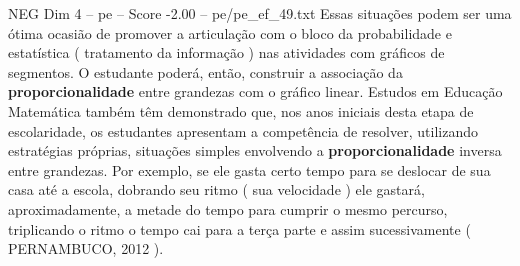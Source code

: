 \begin{textsample}{NEG Dim 4 – pe – Score -2.00 – pe/pe\_ef\_49.txt}
Essas situações podem ser uma ótima ocasião de promover a articulação com o bloco da probabilidade e estatística ( tratamento da informação ) nas atividades com gráficos de segmentos.
O estudante poderá, então, construir a associação da \textbf{proporcionalidade} entre grandezas com o gráfico linear.
Estudos em Educação Matemática também têm demonstrado que, nos anos iniciais desta etapa de escolaridade, os estudantes apresentam a competência de resolver, utilizando estratégias próprias, situações simples envolvendo a \textbf{proporcionalidade} inversa entre grandezas.
Por exemplo, se ele gasta certo tempo para se deslocar de sua casa até a escola, dobrando seu ritmo ( sua velocidade ) ele gastará, aproximadamente, a metade do tempo para cumprir o mesmo percurso, triplicando o ritmo o tempo cai para a terça parte e assim sucessivamente ( PERNAMBUCO, 2012 ).

\end{textsample}
